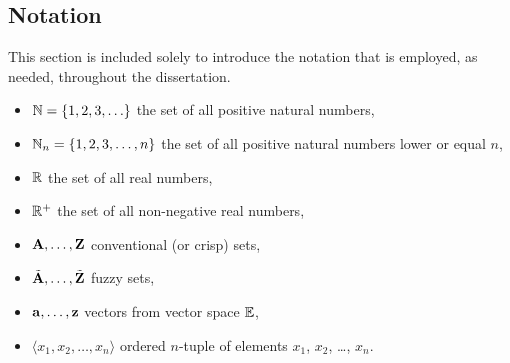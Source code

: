 \subsection{Notation}
 This section is included solely to introduce the notation that is employed, as needed, throughout the dissertation.

\begin{itemize}
\item $\mathbb{N}=\left\{1,2,3,\ldots\right\}$ the set of all positive natural numbers,
\item $\mathbb{N}_n=\left\{1,2,3,\ldots,n\right\}$ the set of all positive natural numbers lower or equal $n$,
\item $\mathbb{R}$ the set of all real numbers,
\item $\mathbb{R}^+$ the set of all non-negative real numbers,
\item ${\mathbf{A}},\ldots,{\mathbf{Z}}$ conventional (or crisp) sets,
\item ${\tilde{{\mathbf{A}}}},\ldots,{\tilde{{\mathbf{Z}}}}$ fuzzy sets,
\item ${\mathbf{a}},\ldots,{\mathbf{z}}$ vectors from vector space $\mathbb{E}$,
\item $\langle x_1,x_2,\ldots,x_n \rangle$ ordered $n$-tuple of elements $x_1$, $x_2$, \ldots, $x_n$.
\end{itemize}

